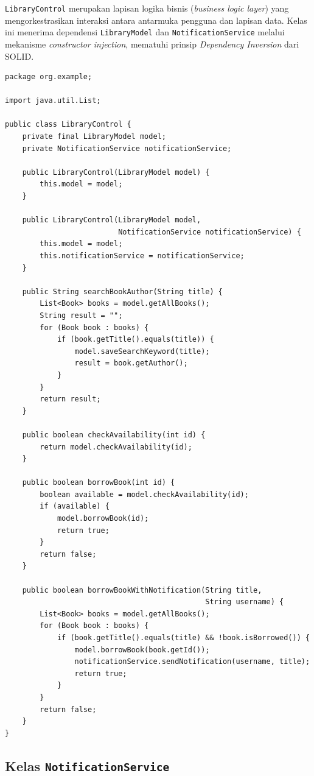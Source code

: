 \documentclass[12pt,a4paper]{article}
\begin{document}
\texttt{LibraryControl} merupakan lapisan logika bisnis (\textit{business logic
layer}) yang mengorkestrasikan interaksi antara antarmuka pengguna dan lapisan
data. Kelas ini menerima dependensi \texttt{LibraryModel} dan
\texttt{NotificationService} melalui mekanisme \textit{constructor injection},
mematuhi prinsip \textit{Dependency Inversion} dari SOLID.

\begin{lstlisting}[caption={Implementasi kelas \texttt{LibraryControl}},
                   label={lst:control}]
package org.example;

import java.util.List;

public class LibraryControl {
    private final LibraryModel model;
    private NotificationService notificationService;

    public LibraryControl(LibraryModel model) {
        this.model = model;
    }

    public LibraryControl(LibraryModel model,
                          NotificationService notificationService) {
        this.model = model;
        this.notificationService = notificationService;
    }

    public String searchBookAuthor(String title) {
        List<Book> books = model.getAllBooks();
        String result = "";
        for (Book book : books) {
            if (book.getTitle().equals(title)) {
                model.saveSearchKeyword(title);
                result = book.getAuthor();
            }
        }
        return result;
    }

    public boolean checkAvailability(int id) {
        return model.checkAvailability(id);
    }

    public boolean borrowBook(int id) {
        boolean available = model.checkAvailability(id);
        if (available) {
            model.borrowBook(id);
            return true;
        }
        return false;
    }

    public boolean borrowBookWithNotification(String title,
                                              String username) {
        List<Book> books = model.getAllBooks();
        for (Book book : books) {
            if (book.getTitle().equals(title) && !book.isBorrowed()) {
                model.borrowBook(book.getId());
                notificationService.sendNotification(username, title);
                return true;
            }
        }
        return false;
    }
}
\end{lstlisting}

\subsection{Kelas \texttt{NotificationService}}
\end{document}
